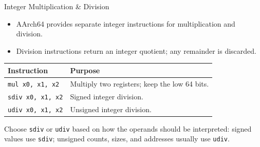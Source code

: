 \documentclass[aspectratio=169,11pt,t]{beamer}
\newcommand{\code}[1]{\texttt{#1}}
\begin{document}
\begin{frame}{Integer Multiplication \& Division}
\large
\begin{itemize}\setlength{\itemsep}{6pt}
  \item AArch64 provides separate integer instructions for multiplication and division.
  \item Division instructions return an integer quotient; any remainder is discarded.
\end{itemize}

\vspace{0.18cm}
\begin{center}
\small
\setlength{\tabcolsep}{8pt}
\begin{tabular}{ll}
\toprule
\textbf{Instruction} & \textbf{Purpose} \\
\midrule
\code{mul  x0, x1, x2} & Multiply two registers; keep the low 64 bits. \\
\code{sdiv x0, x1, x2} & Signed integer division. \\
\code{udiv x0, x1, x2} & Unsigned integer division. \\
\bottomrule
\end{tabular}
\end{center}

\vspace{0.25cm}
\normalsize
Choose \code{sdiv} or \code{udiv} based on how the operands should be interpreted: signed values use \code{sdiv}; unsigned counts, sizes, and addresses usually use \code{udiv}.
\end{frame}






\end{document}

